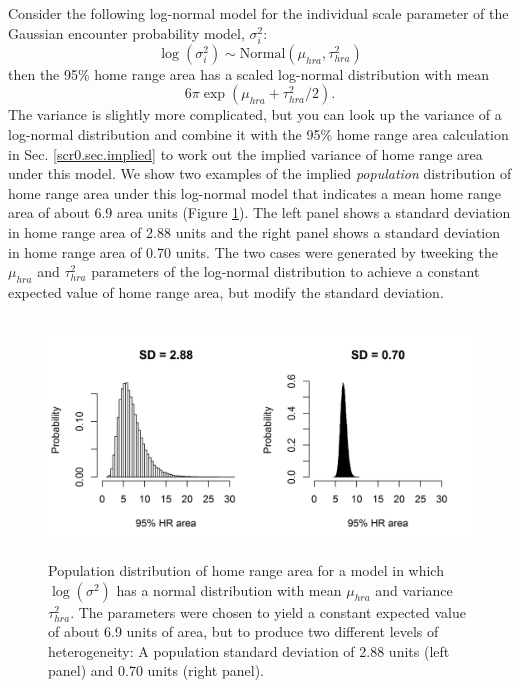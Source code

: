 Consider the following log-normal model for the individual scale parameter
of the Gaussian encounter probability model, $\sigma_{i}^{2}$:
\[
 \log(\sigma^{2}_{i}) \sim \mbox{Normal}(\mu_{hra}, \tau^{2}_{hra})
\]
then the 95\% home range area has a scaled
log-normal distribution with mean 
\[
6 \pi \exp(\mu_{hra} + \tau^{2}_{hra}/2). 
\]
The variance is slightly more complicated, but you
can look up the variance of a log-normal distribution and combine it
with the 95\% home range area calculation in
Sec. \ref{scr0.sec.implied} to work out the implied variance of home
range area under this model.
We show two examples of the implied {\it population} distribution of
home range area under this log-normal model that indicates
 a mean home range area of about 6.9 area units (Figure
\ref{covariates.fig.one}). The left panel shows a standard deviation
in home range area of 2.88 units and the right panel shows a standard
deviation in home range area of 0.70 units. The two cases were
generated by tweeking the $\mu_{hra}$ and $\tau^{2}_{hra}$ parameters
of the log-normal distribution to achieve a constant expected value of
home range area, but modify the standard deviation. 




\begin{figure}[ht]
\begin{center}
\includegraphics[height=2.5in,width=5in]{Ch7-Covariates/figs/area_heterogeneity.png}
\end{center}
\caption{
Population distribution of home range area for a model in which
$\log(\sigma^{2})$ has a normal distribution with mean $\mu_{hra}$ and
variance $\tau^{2}_{hra}$. The parameters were chosen to yield a
constant expected value of about 6.9 units of area, but to produce two
different levels of heterogeneity: A population standard deviation of
2.88 units (left panel) and 0.70 units (right panel). 
}
\label{covariates.fig.one}
\end{figure}



